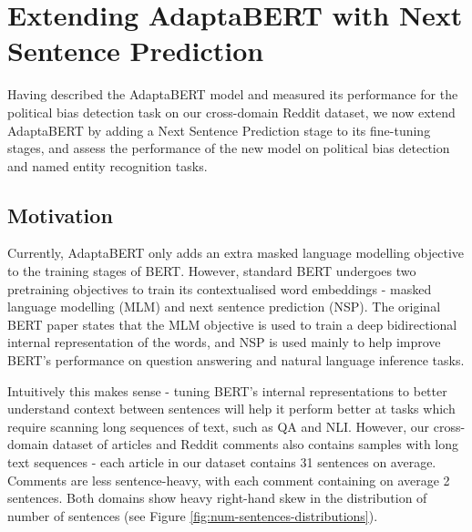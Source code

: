 \chapter{Extending AdaptaBERT with Next Sentence Prediction} \label{chap:extending-adaptabert}

Having described the AdaptaBERT model and measured its performance for the political bias detection task on our cross-domain Reddit dataset, we now extend AdaptaBERT by adding a Next Sentence Prediction stage to its fine-tuning stages, and assess the performance of the new model on political bias detection and named entity recognition tasks.

\section{Motivation}

Currently, AdaptaBERT only adds an extra masked language modelling objective to the training stages of BERT. However, standard BERT undergoes two pretraining objectives to train its contextualised word embeddings - masked language modelling (MLM) and next sentence prediction (NSP). The original BERT paper \cite{bert} states that the MLM objective is used to train a deep bidirectional internal representation of the words, and NSP is used mainly to help improve BERT's performance on question answering and natural language inference tasks.

Intuitively this makes sense - tuning BERT's internal representations to better understand context between sentences will help it perform better at tasks which require scanning long sequences of text, such as QA and NLI. However, our cross-domain dataset of articles and Reddit comments also contains samples with long text sequences - each article in our dataset contains 31 sentences on average. Comments are less sentence-heavy, with each comment containing on average 2 sentences. Both domains show heavy right-hand skew in the distribution of number of sentences (see Figure \ref{fig:num-sentences-distributions}).

